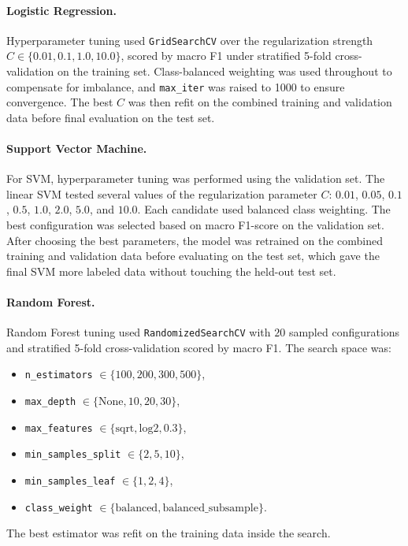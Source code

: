 \documentclass[11pt]{article}
\begin{document}
\paragraph{Logistic Regression.}
Hyperparameter tuning used \texttt{GridSearchCV} over the regularization
strength $C \in \{0.01, 0.1, 1.0, 10.0\}$, scored by macro F1 under stratified
5-fold cross-validation on the training set. Class-balanced weighting was
used throughout to compensate for imbalance, and \texttt{max\_iter} was
raised to 1000 to ensure convergence. The best $C$ was then refit on the
combined training and validation data before final evaluation on the test
set.

\paragraph{Support Vector Machine.}
For SVM, hyperparameter tuning was performed using the validation set. The
linear SVM tested several values of the regularization parameter $C$:
$0.01$, $0.05$, $0.1$, $0.5$, $1.0$, $2.0$, $5.0$, and $10.0$. Each candidate
used balanced class weighting. The best configuration was selected based on
macro F1-score on the validation set. After choosing the best
parameters, the model was retrained on the combined training and
validation data before evaluating on the test set, which gave the final
SVM more labeled data without touching the held-out test set.

\paragraph{Random Forest.}
Random Forest tuning used \texttt{RandomizedSearchCV} with $20$ sampled
configurations and stratified 5-fold cross-validation scored by macro F1.
The search space was:
\begin{itemize}[leftmargin=1.5em, itemsep=0pt, topsep=2pt]
\item \texttt{n\_estimators} $\in \{100, 200, 300, 500\}$,
\item \texttt{max\_depth} $\in \{\text{None}, 10, 20, 30\}$,
\item \texttt{max\_features} $\in \{\text{sqrt}, \text{log2}, 0.3\}$,
\item \texttt{min\_samples\_split} $\in \{2, 5, 10\}$,
\item \texttt{min\_samples\_leaf} $\in \{1, 2, 4\}$,
\item \texttt{class\_weight} $\in \{\text{balanced}, \text{balanced\_subsample}\}$.
\end{itemize}
The best estimator was refit on the training data inside the search.
\end{document}
